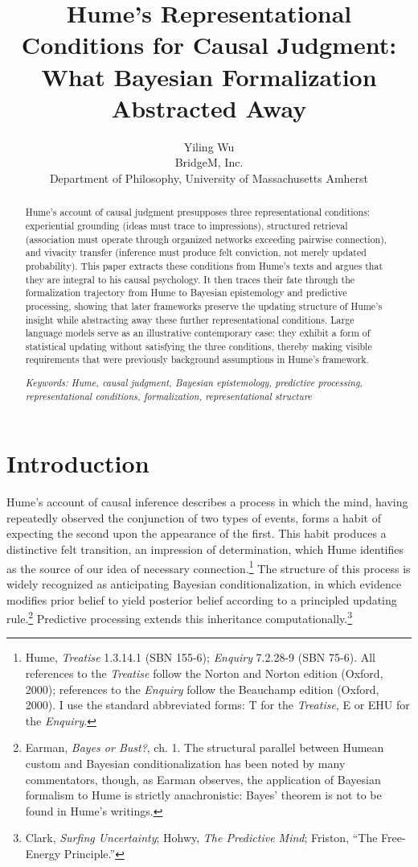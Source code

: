 \documentclass[11pt]{article}
\title{\Large\bf Hume's Representational Conditions for Causal Judgment:\\ What Bayesian Formalization Abstracted Away}
\author{Yiling Wu\\
\normalsize BridgeM, Inc.\\
\normalsize Department of Philosophy, University of Massachusetts Amherst}
\date{}
\begin{document}
\maketitle
\thispagestyle{empty}

\begin{abstract}
\noindent Hume's account of causal judgment presupposes three representational conditions: experiential grounding (ideas must trace to impressions), structured retrieval (association must operate through organized networks exceeding pairwise connection), and vivacity transfer (inference must produce felt conviction, not merely updated probability). This paper extracts these conditions from Hume's texts and argues that they are integral to his causal psychology. It then traces their fate through the formalization trajectory from Hume to Bayesian epistemology and predictive processing, showing that later frameworks preserve the updating structure of Hume's insight while abstracting away these further representational conditions. Large language models serve as an illustrative contemporary case: they exhibit a form of statistical updating without satisfying the three conditions, thereby making visible requirements that were previously background assumptions in Hume's framework.

\vspace{0.5em}
\noindent \emph{Keywords: Hume, causal judgment, Bayesian epistemology, predictive processing, representational conditions, formalization, representational structure}
\end{abstract}

\section{Introduction}

Hume's account of causal inference describes a process in which the mind, having repeatedly observed the conjunction of two types of events, forms a habit of expecting the second upon the appearance of the first. This habit produces a distinctive felt transition, an impression of determination, which Hume identifies as the source of our idea of necessary connection.\footnote{Hume, \emph{Treatise} 1.3.14.1 (SBN 155-6); \emph{Enquiry} 7.2.28-9 (SBN 75-6). All references to the \emph{Treatise} follow the Norton and Norton edition (Oxford, 2000); references to the \emph{Enquiry} follow the Beauchamp edition (Oxford, 2000). I use the standard abbreviated forms: T for the \emph{Treatise}, E or EHU for the \emph{Enquiry}.} The structure of this process is widely recognized as anticipating Bayesian conditionalization, in which evidence modifies prior belief to yield posterior belief according to a principled updating rule.\footnote{Earman, \emph{Bayes or Bust?}, ch. 1. The structural parallel between Humean custom and Bayesian conditionalization has been noted by many commentators, though, as Earman observes, the application of Bayesian formalism to Hume is strictly anachronistic: Bayes' theorem is not to be found in Hume's writings.} Predictive processing extends this inheritance computationally.\footnote{Clark, \emph{Surfing Uncertainty}; Hohwy, \emph{The Predictive Mind}; Friston, ``The Free-Energy Principle.''}
\end{document}
